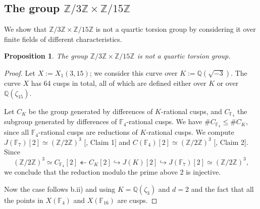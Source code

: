 \documentclass[11pt,reqno]{amsart}
\DeclareMathOperator{\gon}{gon}
\newtheorem{proposition}[theorem]{Proposition}
\theoremstyle{definition}
\numberwithin{equation}{section}
\newcommand{\Q}{\mathbb{Q}}
\newcommand{\Z}{\mathbb{Z}}
\newcommand{\F}{\mathbb{F}}
\newcommand{\PP}{\mathbb{P}}
\def\torz#1{\mathbb Z /#1 \mathbb Z}
\def\tg#1#2{\mathbb Z/#1\mathbb Z \times \mathbb Z /#2 \mathbb Z}
\newcommand{\githubbare}[1]{\href{https://github.com/nt-lib/quartic-torsion/blob/main/#1}{\path{#1}}}
\newcommand{\github}[2]{[\githubbare{#1}, #2]}
\begin{document}

\subsection{The group $\tg{3}{15}$}

We show that $\tg{3}{15}$ is not a quartic torsion group by considering it over finite fields of different characteristics. 

\begin{proposition}\label{prop:3x15}
    The group $\tg{3}{15}$ is not a quartic torsion group.
\end{proposition}
\begin{proof}
    Let $X:=X_1(3,15)$; we consider this curve over $K:=\Q(\sqrt {-3})$. The curve $X$ has 64 cusps in total, all of which are defined either over $K$ or over $\Q(\zeta_{15})$.
    
     Let $C_K$ be the group generated by differences of $K$-rational cusps, and $C_{\F_4}$ the subgroup generated by differences of $\F_4$-rational cusps. We have $\#C_{\F_4}\leq \#C_{K}$, since all $\F_4$-rational cusps are reductions of $K$-rational cusps. We compute $J(\F_7)[2]\simeq (\torz{2})^3$ \github{X1_3_15.m}{Claim 1} and $C(\F_4)[2]\simeq (\Z/2\Z)^3$ \github{X1_3_15.m}{Claim 2}. Since 
    $$(\torz{2})^3\simeq C_{\F_4}[2] \twoheadleftarrow C_K[2] \hookrightarrow J(K)[2] \hookrightarrow J(\F_7)[2] \simeq (\torz{2})^3, $$
    we conclude that the reduction modulo the prime above $2$ is injective.  

    Now the case follows  b.ii) and  using $K=\Q(\zeta_3)$ and $d=2$ and the fact that all the points in $X(\F_4)$ and $X(\F_{16})$ are cusps.   
\end{proof}
\end{document}
